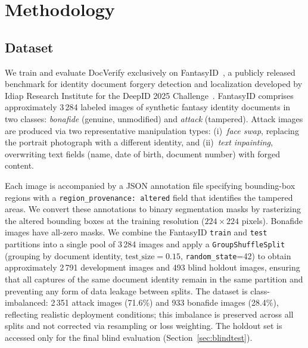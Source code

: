 
\section{Methodology}
\label{sec:method}

\subsection{Dataset}
\label{subsec:dataset}

We train and evaluate DocVerify exclusively on FantasyID~\cite{fantasyid2024},
a publicly released benchmark for identity document forgery detection and
localization developed by Idiap Research Institute for the DeepID 2025
Challenge~\cite{deepid2025challenge}. FantasyID comprises approximately 3\,284
labeled images of synthetic fantasy identity documents in two classes: \textit{bonafide}
(genuine, unmodified) and \textit{attack} (tampered). Attack images are produced
via two representative manipulation types: (i)~\textit{face swap}, replacing the
portrait photograph with a different identity, and (ii)~\textit{text inpainting},
overwriting text fields (name, date of birth, document number) with forged content.

Each image is accompanied by a JSON annotation file specifying bounding-box
regions with a \texttt{region\allowbreak\_provenance:\allowbreak~altered} field that identifies the
tampered areas. We convert these annotations to binary segmentation masks by
rasterizing the altered bounding boxes at the training resolution
($224 \times 224$ pixels). Bonafide images have all-zero masks. We combine the FantasyID \texttt{train}
and \texttt{test} partitions into a single pool of 3\,284 images and apply a
\texttt{GroupShuffleSplit} (grouping by document identity, $\text{test\_size}=0.15$,
\texttt{random\_state}=42) to obtain approximately 2\,791 development images and
493 blind holdout images, ensuring that all captures of the same document identity
remain in the same partition and preventing any form of data leakage between splits.
The dataset is class-imbalanced: 2\,351 attack images (71.6\%) and 933 bonafide
images (28.4\%), reflecting realistic deployment conditions; this imbalance is
preserved across all splits and not corrected via resampling or loss weighting.
The holdout set is accessed only for the final blind evaluation
(Section~\ref{sec:blindtest}).

